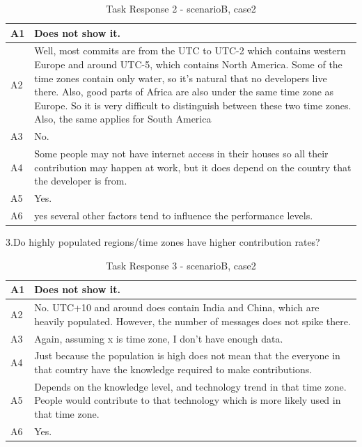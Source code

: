 \documentclass[seploa]{beavtex}
\begin{document}
\begin{appendices}
\begin{table}[H]
\begin{tabular}{ |p{2cm}|p{12cm}| }
 \hline
 A1 & Does not show it.\\
 \hline
 A2 & Well, most commits are from the UTC to UTC-2 which contains western Europe and around UTC-5, which contains North America. Some of the time zones contain only water, so it's natural that no developers live there. Also, good parts of Africa are also under the same time zone as Europe. So it is very difficult to distinguish between these two time zones. Also, the same applies for South America\\ \hline
 A3 & No.\\ \hline
 A4 & Some people may not have internet access in their houses so all their contribution may happen at work, but it does depend on the country that the developer is from.\\ \hline
 A5 & Yes.\\ \hline
 A6 & yes several other factors tend to influence the performance levels.\\
 \hline
\end{tabular}
\caption{Task Response 2 - scenarioB, case2}
\label{tab:table32}
\end{table}

3.Do highly populated regions/time zones have higher contribution rates?	

\begin{table}[H]
\begin{tabular}{ |p{2cm}|p{12cm}| }
 \hline
 A1 & Does not show it.\\ \hline
 A2 & No. UTC+10 and around does contain India and China, which are heavily populated. However, the number of messages does not spike there.\\ \hline
 A3 & Again, assuming x is time zone, I don't have enough data.\\ \hline
 A4 & Just because the population is high does not mean that the everyone in that country have the knowledge required to make contributions.\\ \hline
 A5 & Depends on the knowledge level, and technology trend in that time zone. People would contribute to that technology which is more likely used in that time zone.\\ \hline
 A6 & Yes.\\
 \hline
\end{tabular}
\caption{Task Response 3 - scenarioB, case2}
\label{tab:table33}
\end{table}


\end{appendices}
\end{document}
